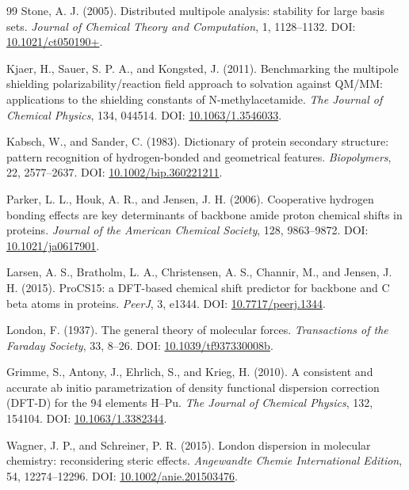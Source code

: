 \documentclass[11pt]{article}
\begin{document}
\begin{thebibliography}{99}
Stone, A. J. (2005).
Distributed multipole analysis: stability for large basis sets.
\emph{Journal of Chemical Theory and Computation}, 1, 1128--1132.
DOI: \href{https://doi.org/10.1021/ct050190+}{10.1021/ct050190+}.

Kjaer, H., Sauer, S. P. A., and Kongsted, J. (2011).
Benchmarking the multipole shielding polarizability/reaction field approach
to solvation against QM/MM: applications to the shielding constants of
N-methylacetamide.
\emph{The Journal of Chemical Physics}, 134, 044514.
DOI: \href{https://doi.org/10.1063/1.3546033}{10.1063/1.3546033}.

Kabsch, W., and Sander, C. (1983).
Dictionary of protein secondary structure: pattern recognition of
hydrogen-bonded and geometrical features.
\emph{Biopolymers}, 22, 2577--2637.
DOI: \href{https://doi.org/10.1002/bip.360221211}{10.1002/bip.360221211}.

Parker, L. L., Houk, A. R., and Jensen, J. H. (2006).
Cooperative hydrogen bonding effects are key determinants of backbone amide
proton chemical shifts in proteins.
\emph{Journal of the American Chemical Society}, 128, 9863--9872.
DOI: \href{https://doi.org/10.1021/ja0617901}{10.1021/ja0617901}.

Larsen, A. S., Bratholm, L. A., Christensen, A. S., Channir, M.,
and Jensen, J. H. (2015).
ProCS15: a DFT-based chemical shift predictor for backbone and C beta atoms
in proteins.
\emph{PeerJ}, 3, e1344.
DOI: \href{https://doi.org/10.7717/peerj.1344}{10.7717/peerj.1344}.

London, F. (1937).
The general theory of molecular forces.
\emph{Transactions of the Faraday Society}, 33, 8--26.
DOI: \href{https://doi.org/10.1039/tf937330008b}{10.1039/tf937330008b}.

Grimme, S., Antony, J., Ehrlich, S., and Krieg, H. (2010).
A consistent and accurate ab initio parametrization of density functional
dispersion correction (DFT-D) for the 94 elements H--Pu.
\emph{The Journal of Chemical Physics}, 132, 154104.
DOI: \href{https://doi.org/10.1063/1.3382344}{10.1063/1.3382344}.

Wagner, J. P., and Schreiner, P. R. (2015).
London dispersion in molecular chemistry: reconsidering steric effects.
\emph{Angewandte Chemie International Edition}, 54, 12274--12296.
DOI: \href{https://doi.org/10.1002/anie.201503476}{10.1002/anie.201503476}.


\end{thebibliography}
\end{document}
